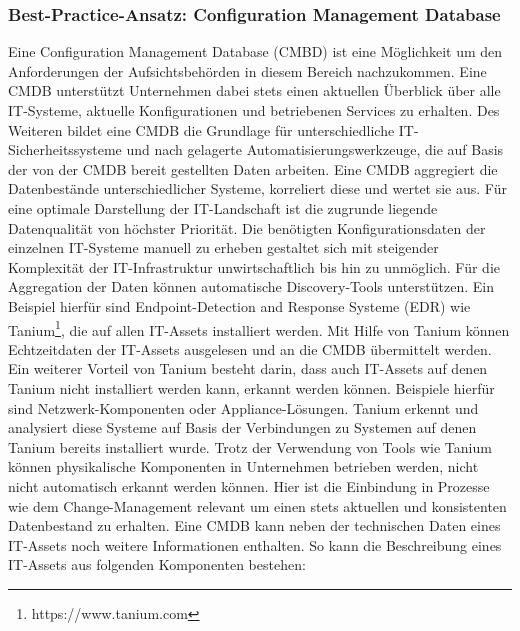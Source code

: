 \subsubsection{Best-Practice-Ansatz: Configuration Management Database}
Eine \glqq{}Configuration Management Database\grqq{} (CMBD) ist eine Möglichkeit um den Anforderungen der Aufsichtsbehörden in diesem Bereich nachzukommen. Eine CMDB unterstützt Unternehmen dabei stets einen aktuellen Überblick über alle IT-Systeme, aktuelle Konfigurationen und betriebenen Services zu erhalten. Des Weiteren bildet eine CMDB die Grundlage für unterschiedliche IT-Sicherheitssysteme und nach gelagerte Automatisierungswerkzeuge, die auf Basis der von der CMDB bereit gestellten Daten arbeiten. Eine CMDB aggregiert die Datenbestände unterschiedlicher Systeme, korreliert diese und wertet sie aus. 
\bigbreak
Für eine optimale Darstellung der IT-Landschaft ist die zugrunde liegende Datenqualität von höchster Priorität. Die benötigten Konfigurationsdaten der einzelnen IT-Systeme manuell zu erheben gestaltet sich mit steigender Komplexität der IT-Infrastruktur unwirtschaftlich bis hin zu unmöglich. Für die Aggregation der Daten können automatische Discovery-Tools unterstützen. Ein Beispiel hierfür sind \glqq{}Endpoint-Detection and Response Systeme\grqq{} (EDR) wie Tanium\footnote{https://www.tanium.com}, die auf allen IT-Assets installiert werden. Mit Hilfe von Tanium können Echtzeitdaten der IT-Assets ausgelesen und an die CMDB übermittelt werden. Ein weiterer Vorteil von Tanium besteht darin, dass auch IT-Assets auf denen Tanium nicht installiert werden kann, erkannt werden können. Beispiele hierfür sind Netzwerk-Komponenten oder Appliance-Lösungen. Tanium erkennt und analysiert diese Systeme auf Basis der Verbindungen zu Systemen auf denen Tanium bereits installiert wurde. 
\bigbreak
Trotz der Verwendung von Tools wie Tanium können physikalische Komponenten in Unternehmen betrieben werden, nicht nicht automatisch erkannt werden können. Hier ist die Einbindung in Prozesse wie dem Change-Management relevant um einen stets aktuellen und konsistenten Datenbestand zu erhalten. Eine CMDB kann neben der technischen Daten eines IT-Assets noch weitere Informationen enthalten. So kann die Beschreibung eines IT-Assets aus folgenden Komponenten bestehen:

